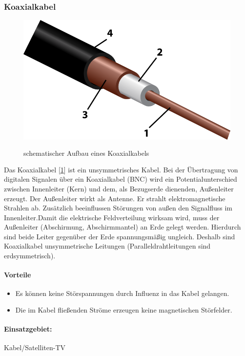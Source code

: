 \documentclass[a4paper,10pt]{article}
\begin{document}
\subsubsection{Koaxialkabel}
\begin{figure}[!htb]
\centering
\includegraphics[scale=0.5]{Coaxial.png}\\
\caption{schematischer Aufbau eines Koaxialkabels}%
\label{coaxialkabel}
\end{figure}

Das Koaxialkabel [\ref{coaxialkabel}] ist ein unsymmetrisches Kabel. Bei der Übertragung von digitalen Signalen über ein Koaxialkabel (BNC) wird ein Potentialunterschied zwischen 
Innenleiter (Kern) und dem, als Bezugserde dienenden, Außenleiter erzeugt. Der Außenleiter wirkt als Antenne. Er strahlt elektromagnetische Strahlen ab. 
Zusätzlich beeinflussen Störungen von außen den Signalfluss im Innenleiter.Damit die elektrische Feldverteilung wirksam wird, muss der Außenleiter (Abschirmung,
Abschirmmantel) an Erde gelegt werden. Hierdurch sind beide Leiter gegenüber der Erde spannungsmäßig ungleich. Deshalb sind Koaxialkabel unsymmetrische Leitungen
(Paralleldrahtleitungen sind erdsymmetrisch).


\paragraph{Vorteile}
\begin{itemize}
 \item Es können keine Störspannungen durch Influenz in das Kabel gelangen.
 \item Die im Kabel fließenden Ströme erzeugen keine magnetischen Störfelder.
\end{itemize}


\paragraph{Einsatzgebiet:}Kabel/Satelliten-TV\\
\end{document}
